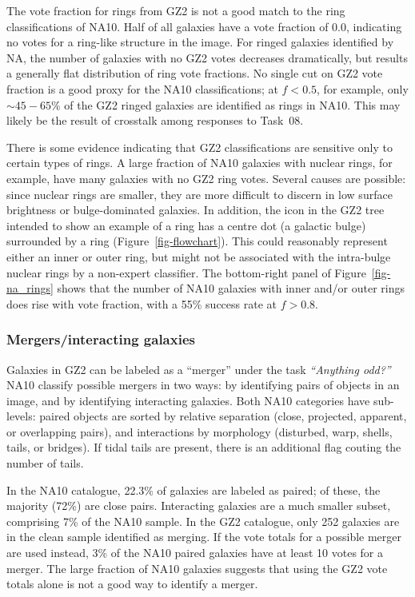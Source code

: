 \documentclass[useAMS,usenatbib]{mn2e}
\begin{document}
The vote fraction for rings from GZ2 is not a good match to the ring classifications of NA10. Half of all galaxies have a vote fraction of 0.0, indicating no votes for a ring-like structure in the image. For ringed galaxies identified by NA, the number of galaxies with no GZ2 votes decreases dramatically, but results a generally flat distribution of ring vote fractions. No single cut on GZ2 vote fraction is a good proxy for the NA10 classifications; at $f<0.5$, for example, only $\sim45-65\%$ of the GZ2 ringed galaxies are identified as rings in NA10. This may likely be the result of crosstalk among responses to Task~08. 

There is some evidence indicating that GZ2 classifications are sensitive only to certain types of rings. A large fraction of NA10 galaxies with nuclear rings, for example, have many galaxies with no GZ2 ring votes. Several causes are possible: since nuclear rings are smaller, they are more difficult to discern in low surface brightness or bulge-dominated galaxies. In addition, the icon in the GZ2 tree intended to show an example of a ring has a centre dot (a galactic bulge) surrounded by a ring (Figure~\ref{fig-flowchart}). This could reasonably represent either an inner or outer ring, but might not be associated with the intra-bulge nuclear rings by a non-expert classifier. The bottom-right panel of Figure~\ref{fig-na_rings} shows that the number of NA10 galaxies with inner and/or outer rings does rise with vote fraction, with a 55\% success rate at $f > 0.8$. 

\subsubsection{Mergers/interacting galaxies}

Galaxies in GZ2 can be labeled as a ``merger'' under the task {\it ``Anything odd?''} NA10 classify possible mergers in two ways: by identifying pairs of objects in an image, and by identifying interacting galaxies. Both NA10 categories have sub-levels: paired objects are sorted by relative separation (close, projected, apparent, or overlapping pairs), and interactions by morphology (disturbed, warp, shells, tails, or bridges). If tidal tails are present, there is an additional flag couting the number of tails. 

In the NA10 catalogue, 22.3\% of galaxies are labeled as paired; of these, the majority (72\%) are close pairs. Interacting galaxies are a much smaller subset, comprising 7\% of the NA10 sample. In the GZ2 catalogue, only 252 galaxies are in the clean sample identified as merging. If the vote totals for a possible merger are used instead, 3\% of the NA10 paired galaxies have at least 10 votes for a merger. The large fraction of NA10 galaxies suggests that using the GZ2 vote totals alone is not a good way to identify a merger. 
\end{document}
